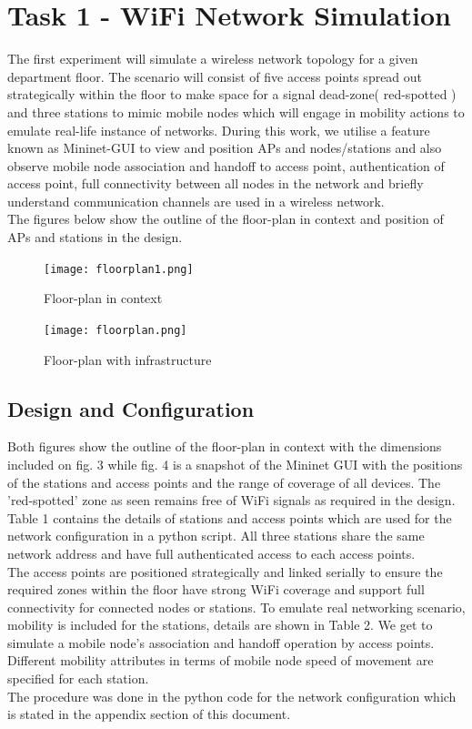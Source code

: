 \documentclass{article}
\begin{document}
\section{Task 1 - WiFi Network Simulation}
The first experiment will simulate a wireless network topology for a given department floor. The scenario will consist of five access points spread out strategically within the floor to make space for a signal dead-zone( red-spotted ) and three stations to mimic mobile nodes which will engage in mobility actions to emulate real-life instance of networks. During this work, we utilise a feature known as Mininet-GUI to view and position APs and nodes/stations and also observe mobile node association and handoff to access point, authentication of access point, full connectivity between all nodes in the network and briefly understand communication channels are used in a wireless network. \\
The figures below show the outline of the floor-plan in context and position of APs and  stations in the design.
    	\begin{figure}[h]
        		\centering
        		\texttt{[image: floorplan1.png]}
        		\caption{Floor-plan in context}
        		\label{fig:t1-1}
        		\endminipage
        		\texttt{[image: floorplan.png]}
        		\caption{Floor-plan with infrastructure}
       		\label{fig:t1-2}
       		\endminipage
    	\end{figure} 
	
\subsection{Design and Configuration}
Both figures show the outline of the floor-plan in context with the dimensions included on fig. 3 while fig. 4 is a snapshot of the Mininet GUI with the positions of the stations and access points and the range of coverage of all devices. The 'red-spotted' zone as seen remains free of WiFi signals as required in the design. \\ Table 1 contains the details of stations and access points which are used for the network configuration in a python script. All three stations share the same network address and have full authenticated access to each access points. \\ The access points are positioned strategically and linked serially to ensure the required zones within the floor have strong WiFi coverage and support full connectivity for connected nodes or stations. To emulate real networking scenario, mobility is included for the stations, details are shown in Table 2. We get to simulate a mobile node's association and handoff operation by access points. Different mobility attributes in terms of mobile node speed of movement are specified for each station. \\ The procedure was done in the python code for the network configuration which is stated in the appendix section of this document.
\end{document}
